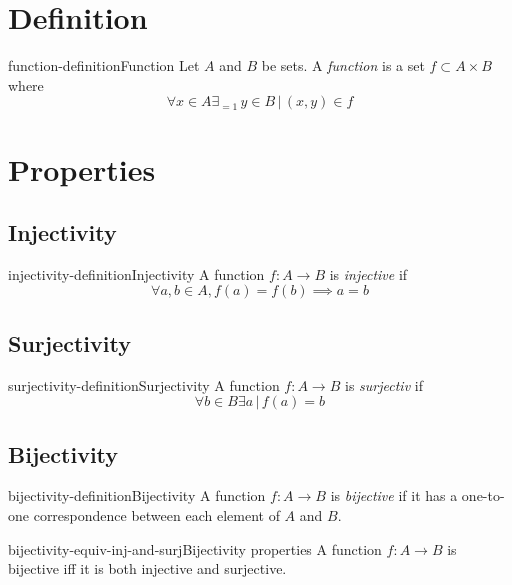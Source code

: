 \documentclass[preview]{standalone}
\begin{document}
\genpage

\section{Definition}

\begin{snippetdefinition}{function-definition}{Function}
    Let \(A\) and \(B\) be sets.
    A \textit{function} is a set \(f \subset A \times B\) where
    \[
        \forall x \in A \exists_{=1} \, y \in B \,|\, (x,y) \in f
    \]
\end{snippetdefinition}

\section{Properties}

\subsection{Injectivity}

\begin{snippetdefinition}{injectivity-definition}{Injectivity}
    A function \(f:A\to B\) is \textit{injective} if
    \[
        \forall a,b \in A, f(a) = f(b) \implies a = b
    \]
\end{snippetdefinition}

\subsection{Surjectivity}

\begin{snippetdefinition}{surjectivity-definition}{Surjectivity}
    A function \(f:A\to B\) is \textit{surjectiv} if
    \[
        \forall b \in B \exists a \,|\, f(a)=b
    \]
\end{snippetdefinition}

\subsection{Bijectivity}

\begin{snippetdefinition}{bijectivity-definition}{Bijectivity}
    A function \(f:A\to B\) is \textit{bijective} if
    it has a one-to-one correspondence between each element of \(A\) and  \(B\).
\end{snippetdefinition}

\begin{snippetcorollary}{bijectivity-equiv-inj-and-surj}{Bijectivity properties}
    A function \(f:A\to B\) is bijective iff it is both injective and surjective.
\end{snippetcorollary}
\end{document}

